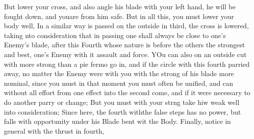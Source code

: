 \newpage


\newpage

But lower your cross, and also angle his blade with your left hand, he
will be fought down, and youare from him safe. But in all this, you
must lower your body well, 
In a similar way is passed on the outside in third, the cross is
lowered, taking nto consideration that in passing one shall always be
close to one's Enemy's blade, after this Fourth whose nature is before
the others the strongest and best, one's Enemy with it assault and force.
YOu can also on an outside cut with more strong than a pie fermo go
in, and if the circle with this fourth parried away, no matter the
Enemy were with you with the strong of his blade more nominal, since
you must in that moment you must often be unified, and can
without all effort from one effect into the second come, and if it
were necessary to do another parry or change;
But you must with your strng take hiw weak well into consideration;
Since here, the fourth withthe false steps has no power, but falls
with opportunity under his Blade bent wit the Body. Finally, notice
in general with  the thrust in fourth,
